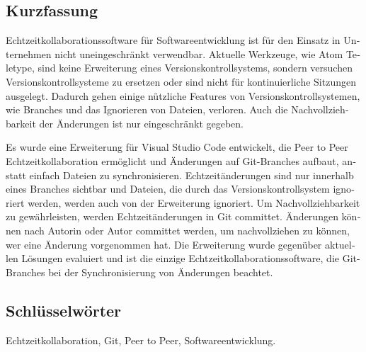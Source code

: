 
\cleardoublepage
{}




\begin{otherlanguage}{ngerman}

  \chapter*{Kurzfassung}

  Echtzeitkollaborationssoftware für Softwareentwicklung ist für den Einsatz in Unternehmen nicht uneingeschränkt verwendbar. Aktuelle Werkzeuge, wie Atom Teletype, sind keine Erweiterung eines Versionskontrollsystems, sondern versuchen Versionskontrollsysteme zu ersetzen oder sind nicht für kontinuierliche Sitzungen ausgelegt. Dadurch gehen einige nützliche Features von Versionskontrollsystemen, wie Branches und das Ignorieren von Dateien, verloren. Auch die Nachvollziehbarkeit der Änderungen ist nur eingeschränkt gegeben.
  
  Es wurde eine Erweiterung für Visual Studio Code entwickelt, die Peer to Peer Echtzeitkollaboration ermöglicht und Änderungen auf Git-Branches aufbaut, anstatt einfach Dateien zu synchronisieren. Echtzeitänderungen sind nur innerhalb eines Branches sichtbar und Dateien, die durch das Versionskontrollsystem ignoriert werden, werden auch von der Erweiterung ignoriert. Um Nachvollziehbarkeit zu gewährleisten, werden Echtzeitänderungen in Git committet. Änderungen können nach Autorin oder Autor committet werden, um nachvollziehen zu können, wer eine Änderung vorgenommen hat. Die Erweiterung wurde gegenüber aktuellen Lösungen evaluiert und ist die einzige Echtzeitkollaborationssoftware, die Git-Branches bei der Synchronisierung von Änderungen beachtet.

	

  \bigskip

  \section*{Schl\"usselw\"orter}
  Echtzeitkollaboration, Git, Peer to Peer,  Softwareentwicklung.

\end{otherlanguage}

